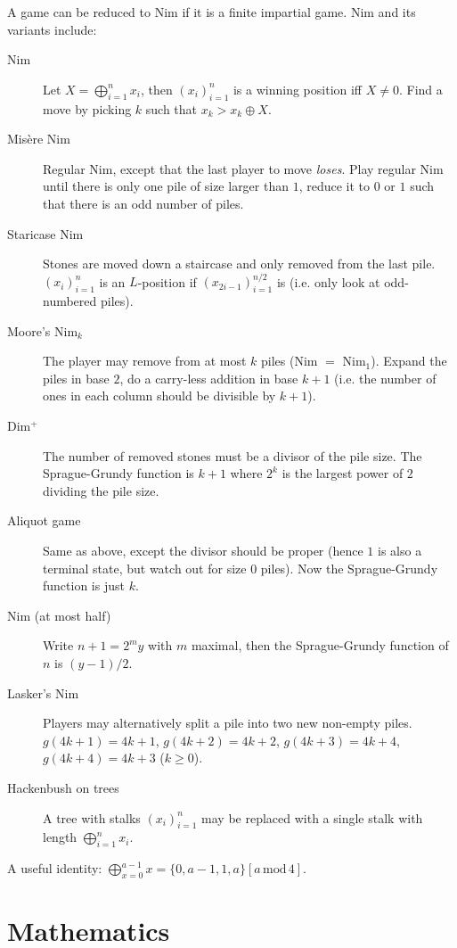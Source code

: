 \documentclass[8pt,a4paper,landscape,oneside]{amsart}
\begin{document}
\begin{multicols*}{3}
A game can be reduced to Nim if it is a finite impartial game. Nim and its variants include:
\begin{description}
	\item[Nim] Let $X = \bigoplus_{i=1}^n x_i$, then $(x_i)_{i=1}^n$ is a winning position iff $X\neq 0$. Find a move by picking $k$ such that $x_k > x_k \oplus X$.
	\item[Mis\`{e}re Nim] Regular Nim, except that the last player to move \textit{loses}. Play regular Nim until there is only one pile of size larger than $1$, reduce it to $0$ or $1$ such that there is an odd number of piles.
	\item[Staricase Nim] Stones are moved down a staircase and only removed from the last pile. $(x_i)_{i=1}^n$ is an $L$-position if $(x_{2i-1})_{i=1}^{n/2}$ is (i.e. only look at odd-numbered piles).
	\item[Moore's Nim$_k$] The player may remove from at most $k$ piles (Nim $=$ Nim$_1$). Expand the piles in base $2$, do a carry-less addition in base $k+1$ (i.e. the number of ones in each column should be divisible by $k+1$).
	\item[Dim$^+$] The number of removed stones must be a divisor of the pile size. The Sprague-Grundy function is $k+1$ where $2^k$ is the largest power of $2$ dividing the pile size.
	\item[Aliquot game] Same as above, except the divisor should be proper (hence $1$ is also a terminal state, but watch out for size $0$ piles). Now the Sprague-Grundy function is just $k$.
	\item[Nim (at most half)] Write $n+1 = 2^my$ with $m$ maximal, then the Sprague-Grundy function of $n$ is $(y - 1) / 2$.
	\item[Lasker's Nim] Players may alternatively split a pile into two new non-empty piles. $g(4k+1) = 4k+1$, $g(4k+2) = 4k+2$, $g(4k+3) = 4k+4$, $g(4k+4) = 4k+3$ ($k\geq 0$).
	\item[Hackenbush on trees] A tree with stalks $(x_i)_{i=1}^n$ may be replaced with a single stalk with length $\bigoplus_{i=1}^n x_i$.
\end{description}

A useful identity: $\bigoplus_{x=0}^{a - 1} x = \{0, a - 1, 1, a\}[a \, \mathrm{mod} \, 4]$.

\section{Mathematics}


\end{multicols*}
\end{document}
